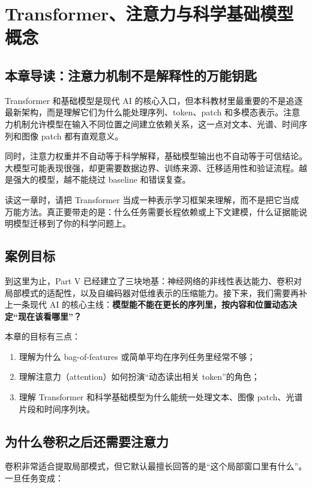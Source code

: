 \chapter{Transformer、注意力与科学基础模型概念}

\section{本章导读：注意力机制不是解释性的万能钥匙}

Transformer 和基础模型是现代 AI 的核心入口，但本科教材里最重要的不是追逐最新架构，而是理解它们为什么能处理序列、token、patch 和多模态表示。注意力机制允许模型在输入不同位置之间建立依赖关系，这一点对文本、光谱、时间序列和图像 patch 都有直观意义。

同时，注意力权重并不自动等于科学解释，基础模型输出也不自动等于可信结论。大模型可能表现很强，却更需要数据边界、训练来源、迁移适用性和验证流程。越是强大的模型，越不能绕过 baseline 和错误复查。

读这一章时，请把 Transformer 当成一种表示学习框架来理解，而不是把它当成万能方法。真正要带走的是：什么任务需要长程依赖或上下文建模，什么证据能说明模型迁移到了你的科学问题上。

\section{案例目标}

到这里为止，Part V 已经建立了三块地基：神经网络的非线性表达能力、卷积对局部模式的适配性，以及自编码器对低维表示的压缩能力。接下来，我们需要再补上一条现代 AI 的核心主线：\textbf{模型能不能在更长的序列里，按内容和位置动态决定“现在该看哪里”？}

本章的目标有三点：

\begin{enumerate}
    \item 理解为什么 bag-of-features 或简单平均在序列任务里经常不够；
    \item 理解注意力（attention）如何扮演“动态读出相关 token”的角色；
    \item 理解 Transformer 和科学基础模型为什么能统一处理文本、图像 patch、光谱片段和时间序列块。
\end{enumerate}

\section{为什么卷积之后还需要注意力}

卷积非常适合提取局部模式，但它默认最擅长回答的是“这个局部窗口里有什么”。一旦任务变成：

